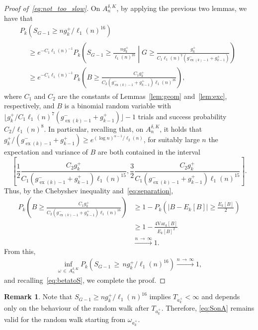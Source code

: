 \documentclass[10pt]{amsart}
\theoremstyle{definition}\newtheorem{defi}[theo]{Definition}\newtheorem{rema}[theo]{Remark}\newtheorem{exam}[theo]{Example}\newtheorem{exem}[theo]{Example}\newtheorem{nota}[theo]{Notation}
\newcommand{\relmiddle}[1]{\mathrel{}\middle#1\mathrel{}}
\newcommand{\cond}{\relmiddle{|}}
\newcommand{\Pk}{{P_k}}
\newcommand{\Ek}{{E_k}}
\newcommand\ex{\operatorname{ex}}
\newcommand{\gtt}[1]{g_{\ex(#1)-1}^-}
\begin{document}
\begin{proof}[Proof of~\eqref{eq:not_too_slow}]
On $A_n^{\delta,K}$, by applying the previous two lemmas, we have that
\begin{multline*}
\Pk\left(S_{G-1}\geq ng_k^+/\ell_1(n)^{16}\right)\\
\begin{aligned}
&\geq e^{-C_1\ell_1(n)^{-1}}\Pk\left(S_{G-1}\geq \frac{ng_k^+}{\ell_1(n)^{16}}\cond G\geq \frac{g_{k}^+}{C_1 \ell_1(n)^7\left(\gtt{k}+g_{k-1}^+\right)}\right)\\
&\geq e^{-C_1\ell_1(n)^{-1}}\Pk\left(B\geq \frac{C_1g_k^+}{C_2\left(\gtt{k}+g_{k-1}^+\right)\ell_1(n)^{16}}\right),
\end{aligned}
\end{multline*}
where $C_1$ and $C_2$ are the constants of Lemmas~\ref{lem:geom} and~\ref{lem:exc}, respectively, and $B$ is a binomial random variable with $\lfloor g_{k}^+ /C_1 \ell_1(n)^7(\gtt{k}+g_{k-1}^+)\rfloor-1$ trials and success probability ${C_2}/{\ell_1(n)^{8}}$. In particular, recalling that, on $A_n^{\delta,K}$, it holds that ${g_{k}^+}/(\gtt{k}+g_{k-1}^+)\geq e^{(\log n)^{\alpha-1}/\ell_2(n)}$, for suitably large $n$ the expectation and variance of $B$ are both contained in the interval
\[
\left[\frac 12\frac{C_2 g_{k}^+}{C_1\left(\gtt{k}+g_{k-1}^+\right) \ell_1(n)^{15}},\frac 32\frac{C_2 g_{k}^+}{C_1\left(\gtt{k}+g_{k-1}^+\right) \ell_1(n)^{15}}\right].
\]
Thus, by the Chebyshev inequality and~\eqref{eq:separation},
\begin{align*}
\Pk\left(B\geq \frac{C_1g_k^+}{C_2\left(\gtt{k}+g_{k-1}^+\right)\ell_1(n)^{16}}\right)&\geq 1-\Pk\left(\left|B-\Ek[B]\right|\geq \frac {\Ek[B]}2\right)\\
&\geq 1-\frac{4\text{Var}_k[B]}{\Ek[B]^2}\\
&\xrightarrow{n\,\to\,\infty}1.
\end{align*}
From this,
\begin{align}\label{eq:SonA}
\inf_{\omega\,\in\,A_n^{\delta,K}} \Pk\left(S_{G-1}\,\geq\,ng_k^+/\ell_1(n)^{16}\right)\xrightarrow{n\,\to\,\infty}1,
\end{align}
and recalling~\eqref{eq:betatoS}, we complete the proof.
\end{proof}

\begin{rema} \label{rem:SonA}
Note that $S_{G-1}\geq ng_k^+/\ell_1(n)^{16}$ implies $T_{{a_k^+}}<\infty$ and depends only on the behaviour of the random walk after $T_{{a_k^+}}$. Therefore, \eqref{eq:SonA} remains valid for the random walk starting from $\omega_{a_k^+}$.
\end{rema}
\end{document}
